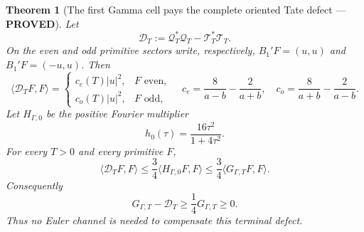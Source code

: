 \documentclass[11pt]{article}
\newtheorem{theorem}{Theorem}
\newcommand{\PROVED}{\textcolor{green!45!black}{\textbf{PROVED}}}
\begin{document}
\begin{theorem}[The first Gamma cell pays the complete oriented Tate defect
--- \PROVED]
Let
\begin{equation}
 \mathcal D_T:=\mathcal Q_T^*\mathcal Q_T-
                    \mathcal T_T^*\mathcal T_T.       \tag{535}
\end{equation}
On the even and odd primitive sectors write, respectively,
\(B_1'F=(u,u)\) and \(B_1'F=(-u,u)\).  Then
\begin{equation}
 \langle\mathcal D_TF,F\rangle=
 \begin{cases}
 c_e(T)|u|^2,&F\text{ even},\\
 c_o(T)|u|^2,&F\text{ odd},
 \end{cases}
 \quad
 c_e=\frac8{a-b}-\frac2{a+b},\quad
 c_o=\frac8{a+b}-\frac2{a-b}.                         \tag{536}
\end{equation}
Let \(H_{\Gamma,0}\) be the positive Fourier multiplier
\begin{equation}
 h_0(\tau)=\frac{16\tau^2}{1+4\tau^2}.                \tag{537}
\end{equation}
For every \(T>0\) and every primitive \(F\),
\begin{equation}
 \boxed{
 \langle\mathcal D_TF,F\rangle
 \le\frac34\langle H_{\Gamma,0}F,F\rangle
 \le\frac34\langle G_{\Gamma,T}F,F\rangle.}           \tag{538}
\end{equation}
Consequently
\begin{equation}
 \boxed{G_{\Gamma,T}-\mathcal D_T
        \ge\frac14G_{\Gamma,T}\ge0.}                  \tag{539}
\end{equation}
Thus no Euler channel is needed to compensate this terminal defect.
\end{theorem}
\end{document}
